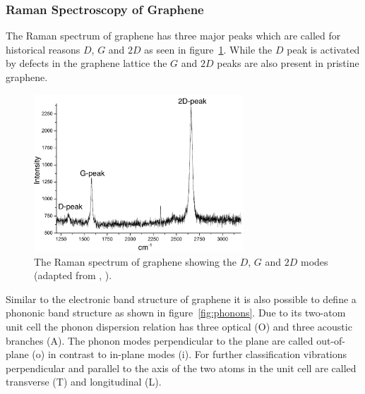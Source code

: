 \subsubsection{Raman Spectroscopy of Graphene}

The Raman spectrum of graphene has three major peaks which are called for historical reasons $D$, $G$ and $2D$ as seen in figure~\ref{fig:dispersion}. While the $D$ peak is activated by defects in the graphene lattice the $G$ and $2D$ peaks are also present in pristine graphene\cite{Ferrari2013}.

\begin{figure}[!h]
  \centering
  \includegraphics[width=0.7\textwidth]{./images/graphene-raman.png}
  \caption{The Raman spectrum of graphene showing the $D$, $G$ and $2D$ modes (adapted from \cite{Ferrari2013}, ).}
  \label{fig:dispersion}
\end{figure}

Similar to the electronic band structure of graphene it is also possible to define a phononic band structure as shown in figure~\ref{fig:phonons}. Due to its two-atom unit cell the phonon dispersion relation has three optical (O) and three acoustic branches (A). The phonon modes perpendicular to the plane are called out-of-plane (o) in contrast to in-plane modes (i). For further classification vibrations perpendicular and parallel to the axis of the two atoms in the unit cell are called transverse (T) and longitudinal (L).

